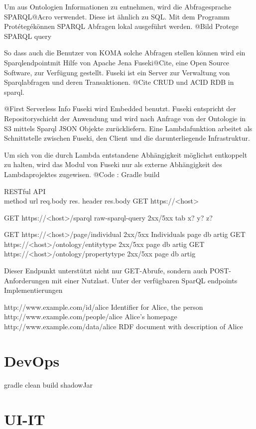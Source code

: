 \documentclass[
12pt,
english,
ngerman,
headsepline,
twoside,
openright,
numbers=noenddot,version=first
]{scrreprt}
\begin{document}
Um aus Ontologien Informationen zu entnehmen, wird die Abfragesprache \glqq SPARQL\grqq @Acro verwendet. Diese ist ähnlich zu SQL. Mit dem Programm \glqq Protétegé\grqq können SPARQL Abfragen lokal ausgeführt werden. 
@Bild Protege SPARQL query

So dass auch die Benutzer von KOMA solche Abfragen stellen können wird ein \glqq Sparqlendpoint\grqq mit Hilfe von Apache Jena Fuseki@Cite, eine Open Source Software, zur Verfügung gestellt. Fuseki ist ein Server zur Verwaltung von Sparqlabfragen und deren Transaktionen. @Cite CRUD und ACID RDB in sparql. 

@First Serverless Info
Fuseki wird Embedded benutzt.
Fuseki entspricht der Repositoryschicht der Anwendung und wird nach Anfrage von der Ontologie in S3 mittels Sparql JSON Objekte zurückliefern. 
Eine Lambdafunktion arbeitet als Schnittstelle zwischen Fuseki, den Client und die darunterliegende Infrastruktur. 

Um sich von die durch Lambda entstandene Abhängigkeit möglichst entkoppelt\cite{FlowerRefactoring} zu halten, wird das Modul von Fuseki nur als externe Abhängigkeit des Lambdaprojektes zugewisen. 
@Code : Gradle build\cite{Muschko2014}

RESTful API \\
method   url    req.body    res. header res.body
GET https://<host>

GET https://<host>/sparql raw-sparql-query    2xx/5xx     tab x? y? z?

GET https://<host>/page/individual 2xx/5xx Individuals page db artig\cite{Hunter2017}
GET https://<host>/ontology/entitytype 2xx/5xx  page db artig
GET https://<host>/ontology/propertytype 2xx/5xx  page db artig

Dieser Endpunkt unterstützt nicht nur GET-Abrufe, sondern auch POST-Anforderungen mit einer Nutzlast.
Unter der verfügbaren SparQL endpoints Implementierungen


http://www.example.com/id/alice
Identifier for Alice, the person
http://www.example.com/people/alice
Alice's homepage
http://www.example.com/data/alice
RDF document with description of Alice

\section{DevOps}
gradle clean build shadowJar


\section{UI-IT}
\end{document}
